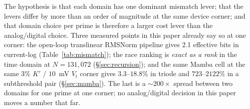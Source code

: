 \documentclass[11pt]{article}
\begin{document}
The hypothesis is that each domain has one dominant mismatch lever; that the levers differ by more than an order of magnitude at the same device corner; and that domain choice per prime is therefore a larger cost lever than the analog/digital choice. Three measured points in this paper already say so at one corner: the open-loop translinear RMSNorm pipeline gives 2.1 effective bits in current-log (Table~\ref{tab:mismatch}); the race ranking is \textit{exact as a rank} in the time domain at $N=131{,}072$ (\S\ref{sec:recursion}); and the same Mamba cell at the same $3\%$ $K'$ / $10$~mV $V_t$ corner gives $3.3$--$18.8\%$ in triode and $723$--$2122\%$ in a subthreshold pair (\S\ref{sec:mamba}). The last is a ${\sim}200\times$ spread between two domains for one prime at one corner; no analog/digital decision in this paper moves a number that far.
\end{document}

